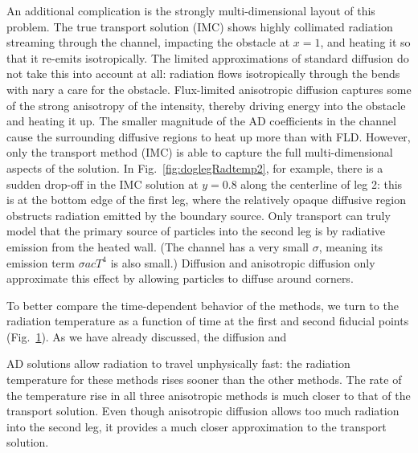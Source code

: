 An additional complication is the strongly multi-dimensional layout of this
problem. The true transport solution (IMC) shows highly collimated radiation
streaming through the channel, impacting the obstacle at $x=1$, and heating it
so that it re-emits isotropically. The limited approximations of standard
diffusion do not take this into
account at all: radiation flows isotropically through the bends with nary a care
for the obstacle. Flux-limited anisotropic diffusion captures some of the
strong anisotropy of the intensity, thereby driving energy into the obstacle and
heating it up. The smaller magnitude of the AD coefficients in the channel
cause the surrounding
diffusive regions to heat up more than with FLD. However, only the transport
method (IMC) is able to capture the full multi-dimensional aspects of the
solution. In Fig.~\ref{fig:doglegRadtemp2}, for example, there is a sudden
drop-off in the IMC solution at $y=0.8$ along the centerline of leg 2: this is
at the bottom edge of the first leg, where the relatively opaque diffusive
region obstructs radiation emitted by the boundary source. Only transport can
truly
model that the primary source of particles into the second leg is by radiative
emission from the heated wall. (The channel has a very small $\sigma$, meaning
its emission term $\sigma a c T^4$ is also small.) Diffusion and anisotropic
diffusion only approximate this effect by allowing particles to diffuse around
corners.

To better compare the time-dependent behavior of the methods, we turn to
the radiation temperature as a function of time at the first and second fiducial
points (Fig.~\ref{fig:doglegFiducial}). As we have already discussed, the
diffusion and
%
\begin{figure}[htb]
  \centering\small
  \subfloat[$x=0.9$, $y=1.0$]{%
    \hspace{-.25in}%
    
  }%
  \subfloat[$x=0.9$, $y=0.3$]{%
    \hspace{-.25in}%
    
  }%
  \label{fig:doglegFiducial}
\end{figure}
%
AD solutions allow radiation to travel unphysically fast: the radiation
temperature for these methods rises sooner than the other methods. The rate of
the temperature rise in all three anisotropic methods is much closer to that of
the transport solution. Even though anisotropic diffusion allows too much
radiation into the second leg, it provides a much closer approximation to the
transport solution.

